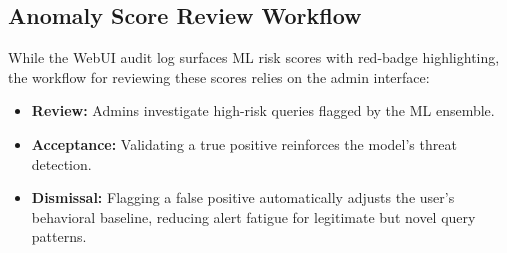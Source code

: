 \subsection{Anomaly Score Review Workflow}
While the WebUI audit log surfaces ML risk scores with red-badge highlighting, the workflow for reviewing these scores relies on the admin interface:
\begin{itemize}
    \item \textbf{Review:} Admins investigate high-risk queries flagged by the ML ensemble.
    \item \textbf{Acceptance:} Validating a true positive reinforces the model's threat detection.
    \item \textbf{Dismissal:} Flagging a false positive automatically adjusts the user's behavioral baseline, reducing alert fatigue for legitimate but novel query patterns.
\end{itemize}

